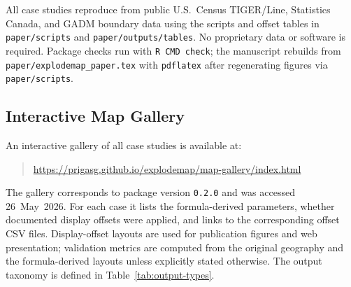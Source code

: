 \documentclass[12pt, a4paper]{article}
\numberwithin{equation}{section}
\begin{document}
\noindent All case studies reproduce from public U.S.\ Census TIGER/Line,
Statistics Canada, and GADM boundary data using the scripts and offset tables
in \texttt{paper/scripts} and \texttt{paper/outputs/tables}.
No proprietary data or software is required.
Package checks run with \texttt{R CMD check}; the manuscript rebuilds from
\texttt{paper/explodemap\_paper.tex} with \texttt{pdflatex} after regenerating
figures via \texttt{paper/scripts}.

\subsection*{Interactive Map Gallery}

An interactive gallery of all case studies is available at:
\begin{quote}
\url{https://prigasg.github.io/explodemap/map-gallery/index.html}
\end{quote}
The gallery corresponds to package version \texttt{0.2.0} and was accessed
\mbox{26 May 2026}. For each case it lists the formula-derived parameters,
whether documented display offsets were applied, and links to the
corresponding offset CSV files. Display-offset layouts are used for
publication figures and web presentation; validation metrics are computed
from the original geography and the formula-derived layouts unless
explicitly stated otherwise. The output taxonomy is defined in
Table~\ref{tab:output-types}.
\end{document}
